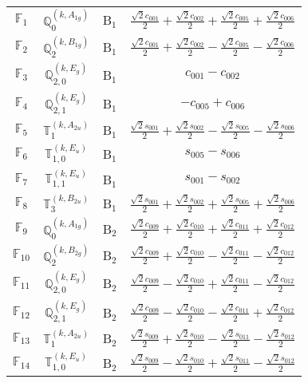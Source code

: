 \documentclass[fleqn,10pt,landscape]{article}
\begin{document}
\begin{itemize}
\begin{center}
\begin{longtable}{c|c|c|c}
$ \mathbb{F}_{1} $ & $\mathbb{Q}_{0}^{(k,A_{1g})}$ & B$_{1}$ & $\frac{\sqrt{2} c_{001}}{2} + \frac{\sqrt{2} c_{002}}{2} + \frac{\sqrt{2} c_{005}}{2} + \frac{\sqrt{2} c_{006}}{2}$ \\
$ \mathbb{F}_{2} $ & $\mathbb{Q}_{2}^{(k,B_{1g})}$ & B$_{1}$ & $\frac{\sqrt{2} c_{001}}{2} + \frac{\sqrt{2} c_{002}}{2} - \frac{\sqrt{2} c_{005}}{2} - \frac{\sqrt{2} c_{006}}{2}$ \\
$ \mathbb{F}_{3} $ & $\mathbb{Q}_{2,0}^{(k,E_{g})}$ & B$_{1}$ & $c_{001} - c_{002}$ \\
$ \mathbb{F}_{4} $ & $\mathbb{Q}_{2,1}^{(k,E_{g})}$ & B$_{1}$ & $- c_{005} + c_{006}$ \\
$ \mathbb{F}_{5} $ & $\mathbb{T}_{1}^{(k,A_{2u})}$ & B$_{1}$ & $\frac{\sqrt{2} s_{001}}{2} + \frac{\sqrt{2} s_{002}}{2} - \frac{\sqrt{2} s_{005}}{2} - \frac{\sqrt{2} s_{006}}{2}$ \\
$ \mathbb{F}_{6} $ & $\mathbb{T}_{1,0}^{(k,E_{u})}$ & B$_{1}$ & $s_{005} - s_{006}$ \\
$ \mathbb{F}_{7} $ & $\mathbb{T}_{1,1}^{(k,E_{u})}$ & B$_{1}$ & $s_{001} - s_{002}$ \\
$ \mathbb{F}_{8} $ & $\mathbb{T}_{3}^{(k,B_{2u})}$ & B$_{1}$ & $\frac{\sqrt{2} s_{001}}{2} + \frac{\sqrt{2} s_{002}}{2} + \frac{\sqrt{2} s_{005}}{2} + \frac{\sqrt{2} s_{006}}{2}$ \\ \hline
$ \mathbb{F}_{9} $ & $\mathbb{Q}_{0}^{(k,A_{1g})}$ & B$_{2}$ & $\frac{\sqrt{2} c_{009}}{2} + \frac{\sqrt{2} c_{010}}{2} + \frac{\sqrt{2} c_{011}}{2} + \frac{\sqrt{2} c_{012}}{2}$ \\
$ \mathbb{F}_{10} $ & $\mathbb{Q}_{2}^{(k,B_{2g})}$ & B$_{2}$ & $\frac{\sqrt{2} c_{009}}{2} + \frac{\sqrt{2} c_{010}}{2} - \frac{\sqrt{2} c_{011}}{2} - \frac{\sqrt{2} c_{012}}{2}$ \\
$ \mathbb{F}_{11} $ & $\mathbb{Q}_{2,0}^{(k,E_{g})}$ & B$_{2}$ & $\frac{\sqrt{2} c_{009}}{2} - \frac{\sqrt{2} c_{010}}{2} + \frac{\sqrt{2} c_{011}}{2} - \frac{\sqrt{2} c_{012}}{2}$ \\
$ \mathbb{F}_{12} $ & $\mathbb{Q}_{2,1}^{(k,E_{g})}$ & B$_{2}$ & $\frac{\sqrt{2} c_{009}}{2} - \frac{\sqrt{2} c_{010}}{2} - \frac{\sqrt{2} c_{011}}{2} + \frac{\sqrt{2} c_{012}}{2}$ \\
$ \mathbb{F}_{13} $ & $\mathbb{T}_{1}^{(k,A_{2u})}$ & B$_{2}$ & $\frac{\sqrt{2} s_{009}}{2} + \frac{\sqrt{2} s_{010}}{2} - \frac{\sqrt{2} s_{011}}{2} - \frac{\sqrt{2} s_{012}}{2}$ \\
$ \mathbb{F}_{14} $ & $\mathbb{T}_{1,0}^{(k,E_{u})}$ & B$_{2}$ & $\frac{\sqrt{2} s_{009}}{2} - \frac{\sqrt{2} s_{010}}{2} + \frac{\sqrt{2} s_{011}}{2} - \frac{\sqrt{2} s_{012}}{2}$ \\

\end{longtable}
\end{center}
\end{itemize}
\end{document}
